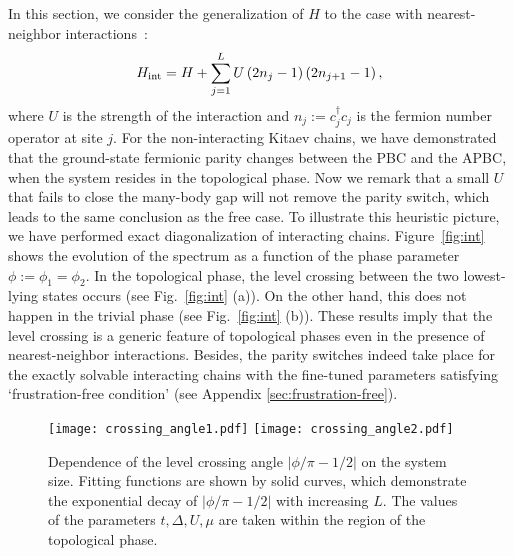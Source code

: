 \documentclass[aps, prb, showpacs, twocolumn, %
amssymb,superscriptaddress]{revtex4}
\def\dag{\dagger}
\begin{document}
In this section, we consider the generalization of $H$ to the case with nearest-neighbor interactions~\cite{Hassler-12}:
\begin{eqnarray}
H_{\rm{int}}=H + \sum^{L}_{j=1} U \left( 2n_{j}-1 \right) \left( 2n_{j+1}-1 \right),
\label{eq: interactingH}
\end{eqnarray}
where $U$ is the strength of the interaction and $n_j:=c^\dag_jc_j$ is the fermion number operator at site $j$. For the non-interacting Kitaev chains, we have demonstrated that the ground-state fermionic parity changes between the PBC and the APBC, when the system resides in the topological phase. Now we remark that a small $U$ that fails to close the many-body gap will not remove the parity switch, which leads to the same conclusion as the free case. To illustrate %
this heuristic picture, we have performed exact diagonalization of interacting chains. Figure~\ref{fig:int} shows the evolution of the spectrum as a %
function of the phase parameter $\phi := \phi_1 = \phi_2$. In the topological phase, the level crossing between the two lowest-lying states occurs (see Fig.~\ref{fig:int} (a)). On the other hand, this does not happen in the trivial phase (see Fig.~\ref{fig:int} (b)). These results imply that the level crossing is a generic feature of topological phases even in the presence of nearest-neighbor interactions. Besides, the parity switches indeed take place for the exactly solvable interacting chains with the fine-tuned parameters satisfying `frustration-free condition\cite{Katsura_Int_Majorana}' (see Appendix \ref{sec:frustration-free}). 

\begin{figure}[t]
	\texttt{[image: crossing\_angle1.pdf]}
   \texttt{[image: crossing\_angle2.pdf]} 
	\caption{Dependence of the level crossing angle $\lvert\phi/\pi-1/2\rvert$ on the system size. 
Fitting functions are shown by solid curves, which demonstrate the exponential decay of $\lvert\phi/\pi-1/2\rvert$ with increasing $L$. The values of the parameters $t, \Delta, U, \mu$ are taken within the region of the topological phase.}
      \label{fig:degangle}
\end{figure}
\end{document}
